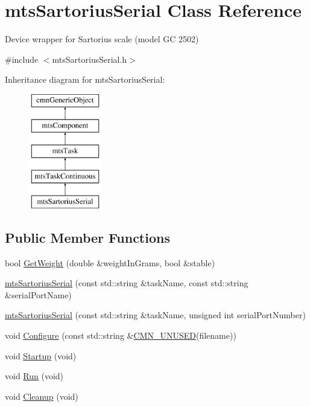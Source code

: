 \hypertarget{classmts_sartorius_serial}{\section{mts\-Sartorius\-Serial Class Reference}
\label{classmts_sartorius_serial}
}


Device wrapper for Sartorius scale (model G\-C 2502)  




{\ttfamily \#include $<$mts\-Sartorius\-Serial.\-h$>$}

Inheritance diagram for mts\-Sartorius\-Serial\-:\begin{figure}[H]
\begin{center}
\leavevmode
\includegraphics[height=5.000000cm]{d7/d2d/classmts_sartorius_serial}
\end{center}
\end{figure}
\subsection*{Public Member Functions}
\begin{DoxyCompactItemize}
\item 
bool \hyperlink{classmts_sartorius_serial_af3579fe150c87aab9d81ac6267e5cc6b}{Get\-Weight} (double \&weight\-In\-Grams, bool \&stable)
\item 
\hyperlink{classmts_sartorius_serial_ab768cdb000bad4801243ddf1af876d27}{mts\-Sartorius\-Serial} (const std\-::string \&task\-Name, const std\-::string \&serial\-Port\-Name)
\item 
\hyperlink{classmts_sartorius_serial_ae0f3fd72900f7f99ccfb07612597cb45}{mts\-Sartorius\-Serial} (const std\-::string \&task\-Name, unsigned int serial\-Port\-Number)
\item 
void \hyperlink{classmts_sartorius_serial_ae6b6992083c4e16a241634b1c976efee}{Configure} (const std\-::string \&\hyperlink{cmn_portability_8h_a021894e2626935fa2305434b1e893ff6}{C\-M\-N\-\_\-\-U\-N\-U\-S\-E\-D}(filename))
\item 
void \hyperlink{classmts_sartorius_serial_a8c18b429ecc6c7dba66ebf23ca1598e0}{Startup} (void)
\item 
void \hyperlink{classmts_sartorius_serial_aa3bb133f25535f1b9af2f2da6356ad18}{Run} (void)
\item 
void \hyperlink{classmts_sartorius_serial_a4fc8df844c89fb18b492d607d43157e9}{Cleanup} (void)
\end{DoxyCompactItemize}
